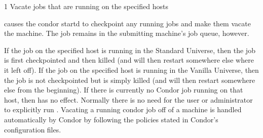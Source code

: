 \begin{ManPage}{\label{man-condor-vacate}}{1}
{Vacate jobs that are running on the specified hosts}
\Synopsis {}
\ToolArgsBase
{}
\ToolArgsLocate


\Description
{} causes the condor startd to checkpoint any running jobs
and make them vacate the machine. The job remains in
the submitting machine's job queue, however. 

If the job on the specified host is running in the Standard Universe, then the
job is first checkpointed and then killed (and will then restart somewhere
else where it left off). If the job on the specified host is running in the
Vanilla Universe, then the job is not checkpointed but is simply killed (and
will then restart somewhere else from the beginning). If there is currently
no Condor job running on that host, then  has no effect. 
 Normally there is no need for the user or administrator to explicitly run
. Vacating a running condor job off of a machine is handled
automatically by Condor by following the policies stated in Condor's
configuration files.   
\begin{Options}
	\ToolArgsBaseDesc
	\ToolArgsLocateDesc
\end{Options}

\end{ManPage}
